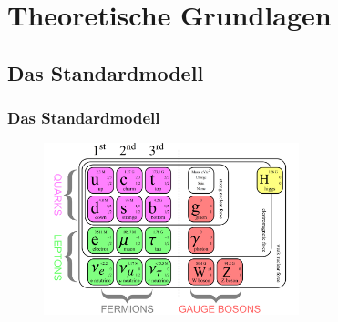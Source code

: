 
\section{Theoretische Grundlagen}

\subsection{Das Standardmodell}
 \begin{frame}
 	\frametitle{Das Standardmodell}
 	\begin{figure}
 	\begin{center}
 	  \includegraphics[width=0.66\textwidth]{graphics/SM1.png}
 	\end{center}
	\end{figure}
 \end{frame}
